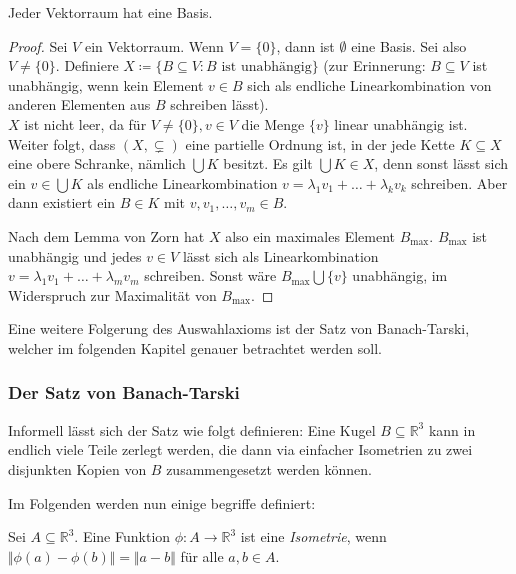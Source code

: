 \begin{satz}
	Jeder Vektorraum hat eine Basis.
\end{satz}
\begin{proof}
	Sei $V$ ein Vektorraum. Wenn $V=\{0\}$, dann ist $\emptyset$ eine Basis. Sei also $V\neq\{0\}$. Definiere $X\coloneqq\{B\subseteq V : B\text{ ist unabhängig}\}$ (zur Erinnerung: $B\subseteq V$ ist unabhängig, wenn kein Element $v\in B$ sich als endliche Linearkombination von anderen Elementen aus $B$ schreiben lässt).
	\\
	$X$ ist nicht leer, da für $V\neq\{0\}, v\in V$ die Menge $\{v\}$ linear unabhängig ist.
	\\
	Weiter folgt, dass $(X,\subsetneq)$ eine partielle Ordnung ist, in der jede Kette $K\subseteq X$ eine obere Schranke, nämlich $\bigcup K$ besitzt. Es gilt $\bigcup K\in X$, denn sonst lässt sich ein $v\in\bigcup K$ als endliche Linearkombination $v=\lambda_1v_1+\dots+\lambda_kv_k$ schreiben. Aber dann existiert ein $B\in K$ mit $v,v_1,\dots,v_m\in B$.
	
	Nach dem Lemma von Zorn hat $X$ also ein maximales Element $B_{\max}$. $B_{\max}$ ist unabhängig und jedes $v\in V$ lässt sich als Linearkombination $v=\lambda_1v_1+\dots+\lambda_mv_m$ schreiben. Sonst wäre $B_{\max}\bigcup \{v\}$ unabhängig, im Widerspruch zur Maximalität von $B_{\max}$.
\end{proof}

Eine weitere Folgerung des Auswahlaxioms ist der Satz von Banach-Tarski, welcher im folgenden Kapitel genauer betrachtet werden soll.

\subsubsection{Der Satz von Banach-Tarski}

Informell lässt sich der Satz wie folgt definieren: \glqq Eine Kugel $B\subseteq\mathbb{R}^3$ kann in endlich viele Teile zerlegt werden, die dann via einfacher Isometrien zu zwei disjunkten Kopien von $B$ zusammengesetzt werden können.\grqq{}

Im Folgenden werden nun einige begriffe definiert:

\begin{definition}[Isometrie]
	Sei $A\subseteq\mathbb{R}^3$. Eine Funktion $\phi:A\to\mathbb{R}^3$ ist eine \textit{Isometrie}, wenn $\Vert\phi(a)-\phi(b)\Vert=\Vert a-b\Vert$ für alle $a,b\in A$.
\end{definition}


